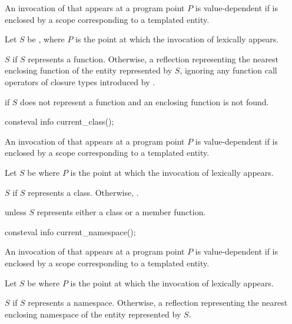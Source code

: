 \begin{itemdescr}
\pnum
An invocation of  that appears at a program point $P$
is value-dependent
if 
is enclosed by a scope corresponding to a templated entity.

\pnum
Let $S$ be ,
where $P$ is the point at which the invocation of
 lexically appears.

\pnum
\returns
$S$ if $S$ represents a function.
Otherwise, a reflection representing the nearest enclosing function of
the entity represented by $S$,
ignoring any function call operators of closure types
introduced by .

\pnum
\throws
{} if
$S$ does not represent a function and an enclosing function is not found.
\end{itemdescr}

%
\begin{itemdecl}
consteval info current_class();
\end{itemdecl}

\begin{itemdescr}
\pnum
An invocation of  that appears at a program point $P$
is value-dependent
if 
is enclosed by a scope corresponding to a templated entity.

\pnum
Let $S$ be 
where $P$ is the point at which the invocation of
 lexically appears.

\pnum
\returns
$S$ if $S$ represents a class.
Otherwise, .

\pnum
\throws
{} unless $S$ represents
either a class or a member function.
\end{itemdescr}

%
\begin{itemdecl}
consteval info current_namespace();
\end{itemdecl}

\begin{itemdescr}
\pnum
An invocation of  that appears at a program point $P$
is value-dependent
if 
is enclosed by a scope corresponding to a templated entity.

\pnum
Let $S$ be 
where $P$ is the point at which the invocation of
 lexically appears.

\pnum
\returns
$S$ if $S$ represents a namespace.
Otherwise, a reflection representing the nearest enclosing namespace
of the entity represented by $S$.
\end{itemdescr}

